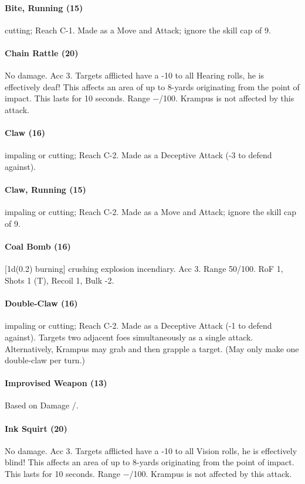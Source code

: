 \paragraph{Bite, Running (15)}  cutting; Reach C-1. Made as a Move and Attack; ignore the skill cap of 9.

\paragraph{Chain Rattle (20)} No damage. Acc 3. Targets afflicted have a -10 to all Hearing rolls, he is effectively deaf! This affects an area of up to 8-yards originating from the point of impact. This lasts for 10 seconds. Range −/100. Krampus is not affected by this attack.

\paragraph{Claw (16)}  impaling or cutting; Reach C-2. Made as a Deceptive Attack (-3 to defend against).

\paragraph{Claw, Running (15)}  impaling or cutting; Reach C-2. Made as a Move and Attack; ignore the skill cap of 9.

\paragraph{Coal Bomb (16)}  [1d(0.2) burning] crushing explosion incendiary. Acc 3. Range 50/100. RoF 1,
Shots 1 (T), Recoil 1, Bulk -2.

\paragraph{Double-Claw (16)}  impaling or cutting; Reach C-2. Made as a Deceptive Attack (-1 to defend against). Targets two adjacent foes simultaneously as a single attack. Alternatively, Krampus may grab and then grapple a target. (May only make one double-claw per turn.)

\paragraph{Improvised Weapon (13)} Based on Damage /.

\paragraph{Ink Squirt (20)} No damage. Acc 3. Targets afflicted have a -10 to all Vision rolls, he is effectively blind! This affects an area of up to 8-yards originating from the point of impact. This lasts for 10 seconds. Range −/100. Krampus is not affected by this attack.

